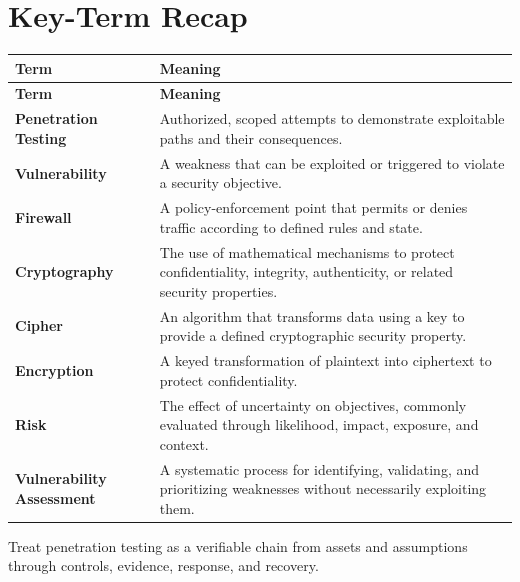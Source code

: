 \documentclass[11pt]{article}
\begin{document}
\section*{Key-Term Recap}
\begin{longtable}{>{\RaggedRight\arraybackslash}p{}>{\RaggedRight\arraybackslash}p{}}
\toprule\rowcolor{Navy}\color{white}\textbf{Term} & \color{white}\textbf{Meaning}\\\midrule
\endfirsthead
\toprule\rowcolor{Navy}\color{white}\textbf{Term} & \color{white}\textbf{Meaning}\\\midrule
\endhead
\textbf{Penetration Testing} & Authorized, scoped attempts to demonstrate exploitable paths and their consequences. \\\midrule
\textbf{Vulnerability} & A weakness that can be exploited or triggered to violate a security objective. \\\midrule
\textbf{Firewall} & A policy-enforcement point that permits or denies traffic according to defined rules and state. \\\midrule
\textbf{Cryptography} & The use of mathematical mechanisms to protect confidentiality, integrity, authenticity, or related security properties. \\\midrule
\textbf{Cipher} & An algorithm that transforms data using a key to provide a defined cryptographic security property. \\\midrule
\textbf{Encryption} & A keyed transformation of plaintext into ciphertext to protect confidentiality. \\\midrule
\textbf{Risk} & The effect of uncertainty on objectives, commonly evaluated through likelihood, impact, exposure, and context. \\\midrule
\textbf{Vulnerability Assessment} & A systematic process for identifying, validating, and prioritizing weaknesses without necessarily exploiting them. \\\midrule
\bottomrule
\end{longtable}
\begin{takeawaybox}
Treat penetration testing as a verifiable chain from assets and assumptions through controls, evidence, response, and recovery.
\end{takeawaybox}
\end{document}
